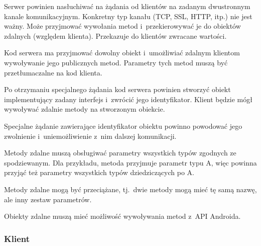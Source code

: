 \begin{description}

Serwer powinien nasłuchiwać na żądania od klientów na zadanym dwustronnym kanale komunikacyjnym.
Konkretny typ kanału (TCP, SSL, HTTP, itp.) nie jest ważny.
Może przyjmować wywołania metod i~przekierowywać je do obiektów zdalnych (względem klienta).
Przekazuje do klientów zwracane wartości.

Kod serwera ma przyjmować dowolny obiekt i~umożliwiać zdalnym klientom wywoływanie jego publicznych metod.
Parametry tych metod muszą być przetłumaczalne na kod klienta.

Po otrzymaniu specjalnego żądania kod serwera powinien stworzyć obiekt implementujący zadany interfejs i~zwrócić jego identyfikator. Klient będzie mógł wywoływać zdalnie metody na stworzonym obiekcie.

Specjalne żądanie zawierające identyfikator obiektu powinno powodować jego zwolnienie i~uniemożliwienie z~nim dalszej komunikacji.

Metody zdalne muszą obsługiwać parametry wszystkich typów zgodnych ze spodziewanym. Dla przykładu, metoda przyjmuje parametr typu A, więc powinna przyjąć też parametry wszystkich typów dziedziczących po A.

Metody zdalne mogą być przeciążane, tj.\ dwie metody mogą mieć tę samą nazwę, ale inny zestaw parametrów.

Obiekty zdalne muszą mieć możliwość wywoływania metod z~API Androida.

\end{description}

\subsubsection{Klient}

